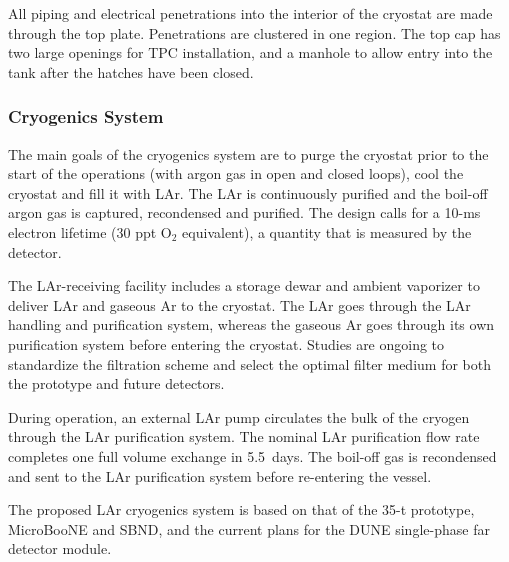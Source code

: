All piping and electrical penetrations into the interior of the
cryostat are made through the top plate.  Penetrations are clustered
in one region.  The top cap has two large openings for TPC
installation, and a manhole to allow entry into the tank after the
hatches have been closed.

\subsubsection{Cryogenics System}

The main goals of the cryogenics system are to purge the cryostat
prior to the start of the operations (with argon gas in open and
closed loops), cool the cryostat and fill it with LAr.  The LAr is
continuously purified and the boil-off argon gas is captured,
recondensed and purified.  The design calls for a 10-ms electron
lifetime (30 ppt O$_2$ equivalent), a quantity that is measured by the
detector.

The LAr-receiving facility includes a storage dewar and ambient
vaporizer to deliver LAr and gaseous Ar to the cryostat. The LAr goes through
the LAr handling and purification system, whereas the gaseous Ar goes through
its own purification system before entering the cryostat.  Studies are
ongoing to standardize the filtration scheme and select the optimal
filter medium for both the prototype and future detectors.

During operation, an external LAr pump circulates the bulk of the
cryogen through the LAr purification system. The nominal LAr
purification flow rate completes one full volume exchange in 5.5~days.
The boil-off gas is recondensed and sent to the LAr
purification system before re-entering the vessel.

The proposed LAr cryogenics system is based on that of the 35-t
prototype, MicroBooNE and SBND, %
and the current plans for the DUNE single-phase far detector module.
